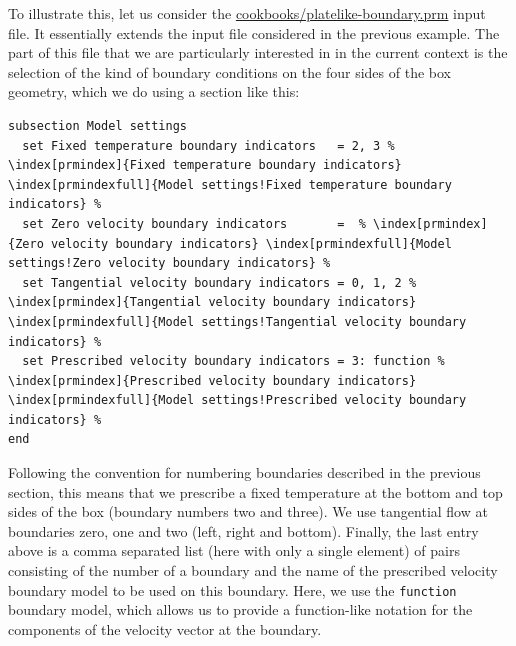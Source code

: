 \documentclass{article}
\begin{document}
To illustrate this, let us consider the \url{cookbooks/platelike-boundary.prm}
input file. It essentially extends the input file considered in the previous example.
The part of this file that we are particularly interested in in the current
context is the selection of the kind of boundary conditions on the four
sides of the box geometry, which we do using a section like this:
\begin{lstlisting}[frame=single,language=prmfile,escapechar=\%]
subsection Model settings
  set Fixed temperature boundary indicators   = 2, 3 % \index[prmindex]{Fixed temperature boundary indicators} \index[prmindexfull]{Model settings!Fixed temperature boundary indicators} %
  set Zero velocity boundary indicators       =  % \index[prmindex]{Zero velocity boundary indicators} \index[prmindexfull]{Model settings!Zero velocity boundary indicators} %
  set Tangential velocity boundary indicators = 0, 1, 2 % \index[prmindex]{Tangential velocity boundary indicators} \index[prmindexfull]{Model settings!Tangential velocity boundary indicators} %
  set Prescribed velocity boundary indicators = 3: function % \index[prmindex]{Prescribed velocity boundary indicators} \index[prmindexfull]{Model settings!Prescribed velocity boundary indicators} %
end
\end{lstlisting}

Following the convention for numbering boundaries described in the previous
section, this means that we prescribe a fixed temperature at the bottom and top sides of the box (boundary
numbers two and three). We use tangential flow at boundaries zero, one and two
(left, right and bottom).
Finally, the last entry above is a comma separated list (here with only a single element) of pairs consisting of the
number of a boundary and the name of the prescribed velocity boundary model to
be used on this boundary. Here, we use the \texttt{function} boundary model,
which allows us to provide a function-like notation for the components of the
velocity vector at the boundary.
\end{document}
